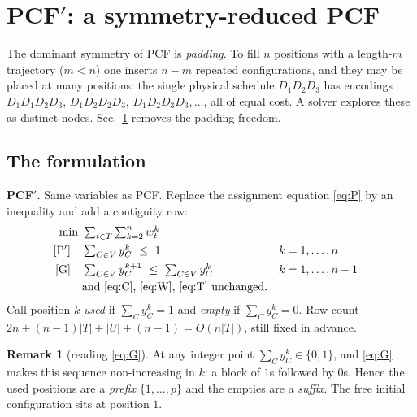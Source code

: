 \documentclass[11pt,a4paper]{article}
\theoremstyle{plain}
\theoremstyle{definition}
\newtheorem{remark}[theorem]{Remark}
\begin{document}
\section{PCF$'$: a symmetry-reduced PCF}\label{sec:pcfp}
The dominant symmetry of PCF is \emph{padding}. To fill $n$ positions with a length-$m$
trajectory ($m<n$) one inserts $n-m$ repeated configurations, and they may be placed at many
positions: the single physical schedule $D_1D_2D_3$ has encodings
$D_1D_1D_2D_3$, $D_1D_2D_2D_3$, $D_1D_2D_3D_3,\dots$, all of equal cost. A solver explores these
as distinct nodes. Sec.~\ref{sec:pcfp} removes the padding freedom.

\subsection{The formulation}
\begin{formbox}
\textbf{PCF$'$.} Same variables as PCF. Replace the assignment equation \eqref{eq:P} by an
inequality and add a contiguity row:
\begin{align}
  \min\ & \textstyle\sum_{t\in T}\sum_{k=2}^{n} w_t^k \notag\\
  \text{[P$'$]}\quad & \textstyle\sum_{C\in V} y_C^k \ \le\ 1 && k=1,\dots,n \label{eq:Pp}\\
  \text{[G]}\quad & \textstyle\sum_{C\in V} y_C^{k+1} \ \le\ \sum_{C\in V} y_C^{k} && k=1,\dots,n-1 \label{eq:G}\\
  & \text{and \eqref{eq:C}, \eqref{eq:W}, \eqref{eq:T} unchanged.}\notag
\end{align}
Call position $k$ \emph{used} if $\sum_C y_C^k=1$ and \emph{empty} if $\sum_C y_C^k=0$.
Row count $2n+(n-1)|T|+|U|+(n-1)=O(n|T|)$, still fixed in advance.
\end{formbox}

\begin{remark}[reading \eqref{eq:G}]\label{rem:prefix}
At any integer point $\sum_C y_C^k\in\{0,1\}$, and \eqref{eq:G} makes this sequence
non-increasing in $k$: a block of $1$s followed by $0$s. Hence the used positions are a
\emph{prefix} $\{1,\dots,p\}$ and the empties are a \emph{suffix}. The free initial
configuration sits at position $1$.
\end{remark}
\end{document}
